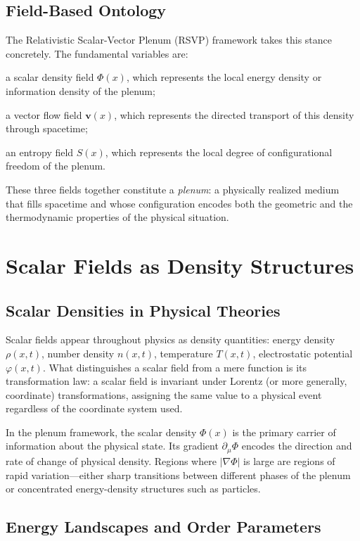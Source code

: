 \documentclass[12pt,a4paper,oneside]{book}
\theoremstyle{definition}
\theoremstyle{plain}
\theoremstyle{remark}
\begin{document}
\section{Field-Based Ontology}

The Relativistic Scalar-Vector Plenum (RSVP) framework takes this stance
concretely. The fundamental variables are:

a scalar density field $\Phi(x)$, which represents the local energy density
or information density of the plenum;

a vector flow field $\mathbf{v}(x)$, which represents the directed transport
of this density through spacetime;

an entropy field $S(x)$, which represents the local degree of
configurational freedom of the plenum.

These three fields together constitute a \emph{plenum}: a physically realized
medium that fills spacetime and whose configuration encodes both the geometric
and the thermodynamic properties of the physical situation.

\chapter{Scalar Fields as Density Structures}

\section{Scalar Densities in Physical Theories}

Scalar fields appear throughout physics as density quantities: energy density
$\rho(x,t)$, number density $n(x,t)$, temperature $T(x,t)$, electrostatic
potential $\varphi(x,t)$. What distinguishes a scalar field from a mere
function is its transformation law: a scalar field is invariant under
Lorentz (or more generally, coordinate) transformations, assigning the same
value to a physical event regardless of the coordinate system used.

In the plenum framework, the scalar density $\Phi(x)$ is the primary carrier
of information about the physical state. Its gradient $\partial_\mu\Phi$
encodes the direction and rate of change of physical density. Regions where
$|\nabla\Phi|$ is large are regions of rapid variation---either sharp
transitions between different phases of the plenum or concentrated
energy-density structures such as particles.

\section{Energy Landscapes and Order Parameters}
\end{document}
